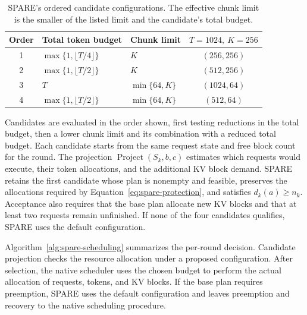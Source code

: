 \documentclass[sigconf,anonymous,review]{acmart}
\begin{document}
\begin{table}[tbp]
\centering
\caption{SPARE's ordered candidate configurations. The effective chunk limit is the smaller of the listed limit and the candidate's total budget.}
\label{tab:spare-candidates}
\small
\begin{tabular}{@{}cllc@{}}
\toprule
Order & Total token budget & Chunk limit & $T=1024,\ K=256$ \\
\midrule
1 & $\max\{1,\lfloor T/4\rfloor\}$ & $K$ & $(256,256)$ \\
2 & $\max\{1,\lfloor T/2\rfloor\}$ & $K$ & $(512,256)$ \\
3 & $T$ & $\min\{64,K\}$ & $(1024,64)$ \\
4 & $\max\{1,\lfloor T/2\rfloor\}$ & $\min\{64,K\}$ & $(512,64)$ \\
\bottomrule
\end{tabular}
\end{table}

Candidates are evaluated in the order shown, first testing reductions in the total budget, then a lower chunk limit and its combination with a reduced total budget. Each candidate starts from the same request state and free block count for the round. The projection $\operatorname{Project}(S_k,b,c)$ estimates which requests would execute, their token allocations, and the additional KV block demand. SPARE retains the first candidate whose plan is nonempty and feasible, preserves the allocations required by Equation~\eqref{eq:spare-protection}, and satisfies $d_k(a)\ge n_k$. Acceptance also requires that the base plan allocate new KV blocks and that at least two requests remain unfinished. If none of the four candidates qualifies, SPARE uses the default configuration.

Algorithm~\ref{alg:spare-scheduling} summarizes the per-round decision. Candidate projection checks the resource allocation under a proposed configuration. After selection, the native scheduler uses the chosen budget to perform the actual allocation of requests, tokens, and KV blocks. If the base plan requires preemption, SPARE uses the default configuration and leaves preemption and recovery to the native scheduling procedure.
\end{document}
